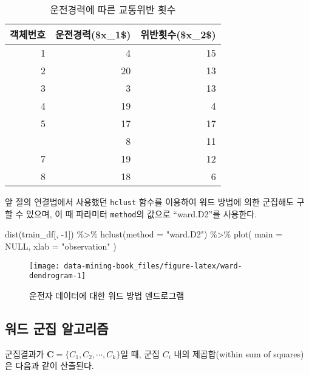 \documentclass[
]{book}
\newenvironment{Shaded}{\begin{snugshade}}{\end{snugshade}}
\newcommand{\AttributeTok}[1]{\textcolor[rgb]{0.77,0.63,0.00}{#1}}
\newcommand{\ConstantTok}[1]{\textcolor[rgb]{0.00,0.00,0.00}{#1}}
\newcommand{\DecValTok}[1]{\textcolor[rgb]{0.00,0.00,0.81}{#1}}
\newcommand{\FunctionTok}[1]{\textcolor[rgb]{0.00,0.00,0.00}{#1}}
\newcommand{\NormalTok}[1]{#1}
\newcommand{\SpecialCharTok}[1]{\textcolor[rgb]{0.00,0.00,0.00}{#1}}
\newcommand{\StringTok}[1]{\textcolor[rgb]{0.31,0.60,0.02}{#1}}
\begin{document}
\begin{table}

\caption{\label{tab:driver-data}운전경력에 따른 교통위반 횟수}
\centering
\begin{tabular}[t]{rrr}
\toprule
객체번호 & 운전경력(\$x\_1\$) & 위반횟수(\$x\_2\$)\\
\midrule
1 & 4 & 15\\
2 & 20 & 13\\
3 & 3 & 13\\
4 & 19 & 4\\
5 & 17 & 17\\
\addlinespace
6 & 8 & 11\\
7 & 19 & 12\\
8 & 18 & 6\\
\bottomrule
\end{tabular}
\end{table}

앞 절의 연결법에서 사용했던 \texttt{hclust} 함수를 이용하여 워드 방법에 의한 군집해도 구할 수 있으며, 이 때 파라미터 \texttt{method}의 값으로 ``ward.D2''를 사용한다.

\begin{Shaded}
\begin{Highlighting}[]
\FunctionTok{dist}\NormalTok{(train\_df[, }\SpecialCharTok{{-}}\DecValTok{1}\NormalTok{]) }\SpecialCharTok{\%\textgreater{}\%}
  \FunctionTok{hclust}\NormalTok{(}\AttributeTok{method =} \StringTok{"ward.D2"}\NormalTok{) }\SpecialCharTok{\%\textgreater{}\%}
  \FunctionTok{plot}\NormalTok{(}
    \AttributeTok{main =} \ConstantTok{NULL}\NormalTok{,}
    \AttributeTok{xlab =} \StringTok{"observation"}
\NormalTok{  )}
\end{Highlighting}
\end{Shaded}

\begin{figure}

{\centering \texttt{[image: data-mining-book\_files/figure-latex/ward-dendrogram-1]} 

}

\caption{운전자 데이터에 대한 워드 방법 덴드로그램}\label{fig:ward-dendrogram}
\end{figure}

\hypertarget{ward-method-algorithm}{%
\subsection{워드 군집 알고리즘}\label{ward-method-algorithm}}

군집결과가 \(\mathbf{C} = \{ C_1, C_2, \cdots, C_k \}\)일 때, 군집 \(C_i\) 내의 제곱합(within sum of squares)은 다음과 같이 산출된다.
\end{document}

